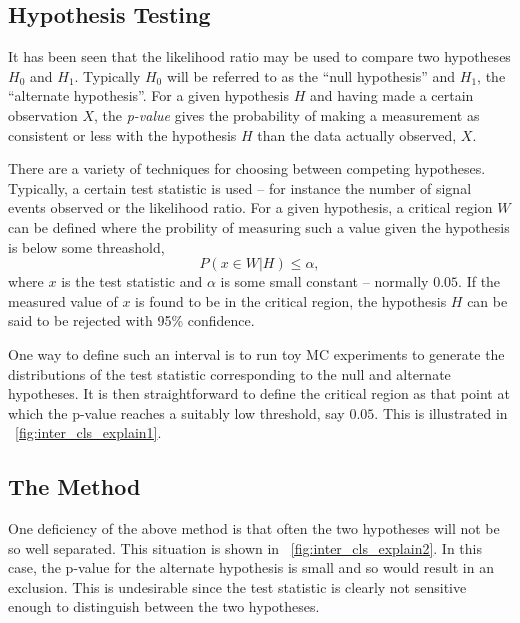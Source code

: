 \subsection{Hypothesis Testing}
\label{sec:inter_cls}
It has been seen that the likelihood ratio may be used to compare two hypotheses
$H_0$ and $H_1$. Typically $H_0$ will be referred to as the ``null hypothesis''
and $H_1$, the ``alternate hypothesis''. For a given hypothesis $H$ and having
made a certain observation $X$, the \emph{p-value} gives the probability of
making a measurement as consistent or less with the hypothesis $H$ than the data
actually observed, $X$.

There are a variety of techniques for choosing between competing
hypotheses. Typically, a certain test statistic is used -- for instance the
number of signal events observed or the likelihood ratio. For a given
hypothesis, a critical region $W$ can be defined where the probility of measuring
such a value given the hypothesis is below some threashold,
\begin{equation*}
P\left(x \in W|H\right) \leq \alpha,
\end{equation*}
where $x$ is the test statistic and $\alpha$ is some small constant -- normally
$0.05$. If the measured value of $x$ is found to be in the critical region, the
hypothesis $H$ can be said to be rejected with 95\% confidence.

One way to define such an interval is to run toy \ac{MC} experiments to
generate the distributions of the test statistic corresponding to the null and
alternate hypotheses. It is then straightforward to define the critical region
as that point at which the p-value reaches a suitably low threshold, say
$0.05$. This is illustrated in \fig~\ref{fig:inter_cls_explain1}.

\begin{figure}[h!]
\centering
{}
\caption[]{}
\label{fig:inter_cls_explain}
\end{figure}

\subsection{The \boldmath{\CLs} Method}
One deficiency of the above method is that often the two hypotheses will not be
so well separated. This situation is shown in
\fig~\ref{fig:inter_cls_explain2}. In this case, the p-value for the alternate
hypothesis is small and so would result in an exclusion. This is undesirable
since the test statistic is clearly not sensitive enough to distinguish between
the two hypotheses.


